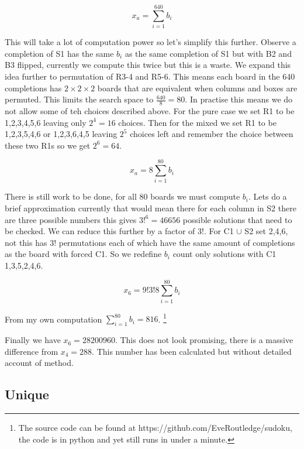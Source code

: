 \documentclass[a4paper,11pt]{report}
\newcounter{col}
\begin{document}
\begin{equation}x_a = \sum^{640}_{i=1}b_i\end{equation}

This will take a lot of computation power so let's simplify this further. Observe a completion of S1 has the same $b_i$ as the same completion of S1 but with B2 and B3 flipped, currently we compute this twice but this is a waste. We expand this idea further to permutation of R3-4 and R5-6. This means each board in the 640 completions has $2\times 2\times 2$ boards that are equivalent when columns and boxes are permuted. This limits the search space to $\frac{640}{8}=80$. In practise this means we do not allow some of teh choices described above. For the pure case we set R1 to be 1,2,3,4,5,6 leaving only $2^4=16$ choices. Then for the mixed we set R1 to be 1,2,3,5,4,6 or 1,2,3,6,4,5 leaving $2^5$ choices left and remember the choice between these two R1s so we get $2^6=64$. 

\begin{equation}x_a=8\sum^{80}_{i=1}b_i\end{equation}

There is still work to be done, for all 80 boards we must compute $b_i$. Lets do a brief approximation currently that would mean there for each column in S2 there are three possible numbers this gives $3!^6 = 46656$ possible solutions that need to be checked. We can reduce this further by a factor of 3!. For C1 $\cup$ S2 set 2,4,6, not this has 3! permutations each of which have the same amount of completions as the board with forced C1. So we redefine $b_i$ count only solutions with C1 1,3,5,2,4,6.

\begin{equation}x_6=9!3!8\sum^{80}_{i=1} b_i\end{equation}

From my own computation $\sum^{80}_{i=1} b_i=816$. \footnote{The source code can be found at https://github.com/EveRoutledge/sudoku, the code is in python and yet still runs in under a minute.}

Finally we have $x_6=28200960$. This does not look promising, there is a massive difference from $x_4=288$. This number has been calculated but without detailed account of method. 

\subsection{Unique}
\end{document}
